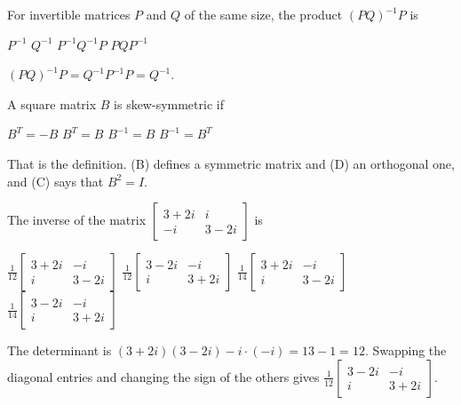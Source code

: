 \begin{question}[id=gate-ce2008-1, source=GATE CE 2008]
For invertible matrices $P$ and $Q$ of the same size, the product $(PQ)^{-1}P$ is
\begin{options}
  \option $P^{-1}$
  \correct $Q^{-1}$
  \option $P^{-1}Q^{-1}P$
  \option $PQP^{-1}$
\end{options}
\begin{solution}
$(PQ)^{-1}P = Q^{-1}P^{-1}P = Q^{-1}$.
\end{solution}
\end{question}

\begin{question}[id=gate-ce2009-1, source=GATE CE 2009]
A square matrix $B$ is skew-symmetric if
\begin{options}
  \correct $B^T = -B$
  \option $B^T = B$
  \option $B^{-1} = B$
  \option $B^{-1} = B^T$
\end{options}
\begin{solution}
That is the definition. (B) defines a symmetric matrix and (D) an orthogonal one, and (C) says that $B^2 = I$.
\end{solution}
\end{question}

\begin{question}[id=gate-ce2010-1, source=GATE CE 2010, marks=2]
The inverse of the matrix $\begin{bmatrix} 3 + 2i & i \\ -i & 3 - 2i \end{bmatrix}$ is
\begin{options}
  \option $\frac{1}{12}\begin{bmatrix} 3 + 2i & -i \\ i & 3 - 2i \end{bmatrix}$
  \correct $\frac{1}{12}\begin{bmatrix} 3 - 2i & -i \\ i & 3 + 2i \end{bmatrix}$
  \option $\frac{1}{14}\begin{bmatrix} 3 + 2i & -i \\ i & 3 - 2i \end{bmatrix}$
  \option $\frac{1}{14}\begin{bmatrix} 3 - 2i & -i \\ i & 3 + 2i \end{bmatrix}$
\end{options}
\begin{solution}
The determinant is $(3 + 2i)(3 - 2i) - i \cdot (-i) = 13 - 1 = 12$. Swapping the diagonal entries and changing the sign of the others gives $\frac{1}{12}\begin{bmatrix} 3 - 2i & -i \\ i & 3 + 2i \end{bmatrix}$.
\end{solution}
\end{question}

